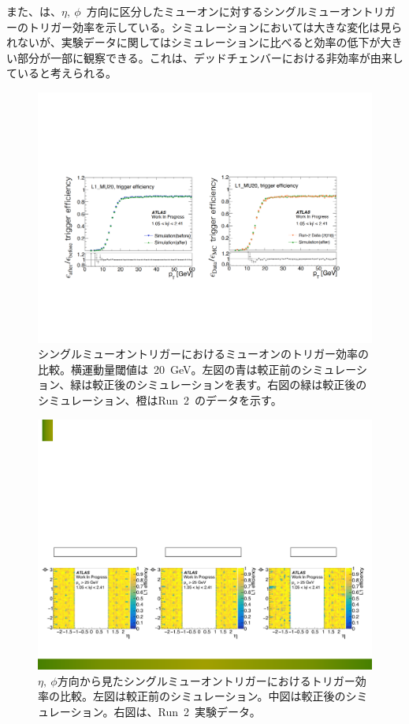 また、は、$\eta,~\phi$~方向に区分したミューオンに対するシングルミューオントリガーのトリガー効率を示している。シミュレーションにおいては大きな変化は見られないが、実験データに関してはシミュレーションに比べると効率の低下が大きい部分が一部に観察できる。これは、デッドチェンバーにおける非効率が由来していると考えられる。
\begin{figure}[H]
        \centering   
        \includegraphics[width=\textwidth,page=1]{img/rec/trig.pdf}
        \caption[シングルミューオントリガーにおけるミューオンのトリガー効率の比較]{シングルミューオントリガーにおけるミューオンのトリガー効率の比較。横運動量閾値は~20~GeV。左図の青は較正前のシミュレーション、緑は較正後のシミュレーションを表す。右図の緑は較正後のシミュレーション、橙はRun~2~のデータを示す。}\label{fig:singletri}
\end{figure}

\begin{figure}[H]
        \centering   
        \includegraphics[width=\textwidth,page=1]{img/rec/tri1.pdf}
        \caption[$\eta, \phi$方向から見たシングルミューオントリガーにおけるトリガー効率の比較]{$\eta,~\phi$方向から見たシングルミューオントリガーにおけるトリガー効率の比較。左図は較正前のシミュレーション。中図は較正後のシミュレーション。右図は、Run~2~実験データ。}\label{fig:singletriep}
\end{figure}

